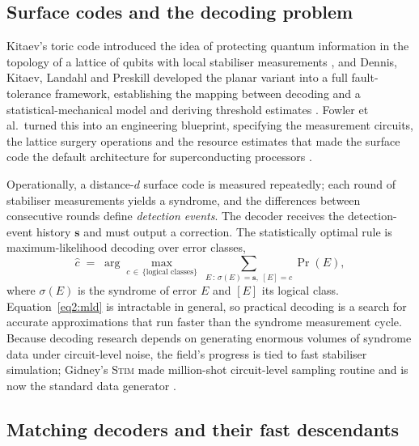 \documentclass[Thesis.tex]{subfiles}
\begin{document}
\subsection{Surface codes and the decoding problem}

Kitaev's toric code introduced the idea of protecting quantum information in
the topology of a lattice of qubits with local stabiliser measurements
\cite{kitaev2003fault}, and Dennis, Kitaev, Landahl and Preskill developed the
planar variant into a full fault-tolerance framework, establishing the
mapping between decoding and a statistical-mechanical model and deriving
threshold estimates \cite{dennis2002topological}. Fowler et al.\ turned this
into an engineering blueprint, specifying the measurement circuits, the
lattice surgery operations and the resource estimates that made the surface
code the default architecture for superconducting processors
\cite{fowler2012surface}.

Operationally, a distance-$d$ surface code is measured repeatedly; each round
of stabiliser measurements yields a syndrome, and the differences between
consecutive rounds define \emph{detection events}. The decoder receives the
detection-event history $\mathbf{s}$ and must output a correction. The
statistically optimal rule is maximum-likelihood decoding over error classes,
\begin{equation}
  \widehat{c} \;=\; \arg\max_{c \,\in\, \{\text{logical classes}\}}\;
  \sum_{E \,:\, \sigma(E)=\mathbf{s},\; [E]=c} \Pr(E),
  \label{eq2:mld}
\end{equation}
where $\sigma(E)$ is the syndrome of error $E$ and $[E]$ its logical class.
Equation~\eqref{eq2:mld} is intractable in general, so practical decoding is a
search for accurate approximations that run faster than the syndrome
measurement cycle. Because decoding research depends on generating enormous
volumes of syndrome data under circuit-level noise, the field's progress is
tied to fast stabiliser simulation; Gidney's \textsc{Stim} made
million-shot circuit-level sampling routine and is now the standard data
generator \cite{gidney2021stim}.

\subsection{Matching decoders and their fast descendants}
\end{document}
